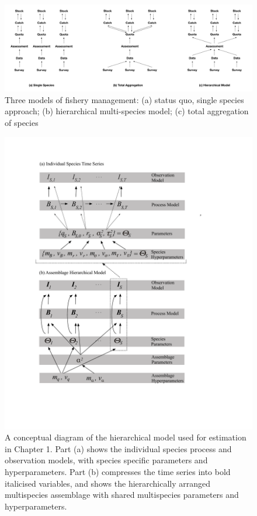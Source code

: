 \documentclass[]{scrartcl}
\begin{document}
\newpage

\begin{landscape}
\begin{figure}[htbp]
\begin{center}
\includegraphics{figures/msFishery.pdf}
\caption{Three models of fishery management: (a) status quo,
single species approach; (b) hierarchical multi-species model; (c) total aggregation of species}\label{fig:3Models}
\end{center}
\end{figure}
\end{landscape}

\newpage

\begin{figure}[htbp]
\centering
\includegraphics{figures/HBMClarkCh1.pdf}
\caption{A conceptual diagram of the hierarchical model used for estimation in Chapter 1.  Part (a) shows the individual species process and observation models, with species specific parameters and hyperparameters. Part (b) compresses the time series into bold italicised variables, and shows the hierarchically arranged multispecies assemblage with shared multispecies parameters and hyperparameters.}\label{fig:HBMCh1}
\end{figure}
\end{document}
